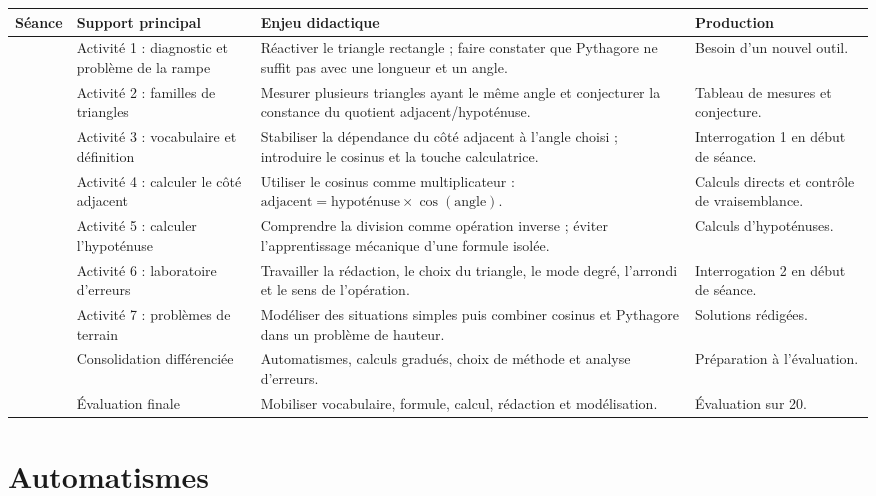 \documentclass[12pt,a4paper]{article}
\begin{document}
\renewcommand{\arraystretch}{1.38}
\begin{tabularx}{\textwidth}{
|>{\centering\arraybackslash}p{1.05cm}
|>{\raggedright\arraybackslash}p{4.2cm}
|>{\raggedright\arraybackslash}X
|>{\raggedright\arraybackslash}p{3.2cm}|}
\hline
\textbf{Séance} & \textbf{Support principal} & \textbf{Enjeu didactique} & \textbf{Production}\\
\hline
1 & Activité 1 : diagnostic et problème de la rampe & Réactiver le triangle rectangle ; faire constater que Pythagore ne suffit pas avec une longueur et un angle. & Besoin d'un nouvel outil.\\
\hline
2 & Activité 2 : familles de triangles & Mesurer plusieurs triangles ayant le même angle et conjecturer la constance du quotient adjacent/hypoténuse. & Tableau de mesures et conjecture.\\
\hline
3 & Activité 3 : vocabulaire et définition & Stabiliser la dépendance du côté adjacent à l'angle choisi ; introduire le cosinus et la touche calculatrice. & Interrogation 1 en début de séance.\\
\hline
4 & Activité 4 : calculer le côté adjacent & Utiliser le cosinus comme multiplicateur : \(\text{adjacent}=\text{hypoténuse}\times\cos(\text{angle})\). & Calculs directs et contrôle de vraisemblance.\\
\hline
5 & Activité 5 : calculer l'hypoténuse & Comprendre la division comme opération inverse ; éviter l'apprentissage mécanique d'une formule isolée. & Calculs d'hypoténuses.\\
\hline
6 & Activité 6 : laboratoire d'erreurs & Travailler la rédaction, le choix du triangle, le mode degré, l'arrondi et le sens de l'opération. & Interrogation 2 en début de séance.\\
\hline
7 & Activité 7 : problèmes de terrain & Modéliser des situations simples puis combiner cosinus et Pythagore dans un problème de hauteur. & Solutions rédigées.\\
\hline
8 & Consolidation différenciée & Automatismes, calculs gradués, choix de méthode et analyse d'erreurs. & Préparation à l'évaluation.\\
\hline
9 & Évaluation finale & Mobiliser vocabulaire, formule, calcul, rédaction et modélisation. & Évaluation sur 20.\\
\hline
\end{tabularx}

\section*{Automatismes}
\end{document}
